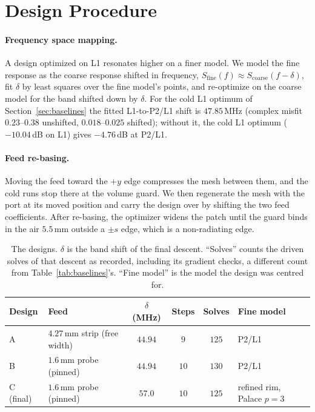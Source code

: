 \documentclass{anvil-paper}
\newcommand{\PL}{P2/L1}
\begin{document}
\section{Design Procedure}
\label{sec:procedure}

\paragraph{Frequency space mapping.}
A design optimized on L1 resonates higher on a finer model. We model the
fine response as the coarse response shifted in frequency,
$S_{\mathrm{fine}}(f) \approx S_{\mathrm{coarse}}(f - \delta)$, fit $\delta$
by least squares over the fine model's points, and re-optimize on the coarse
model for the band shifted down by $\delta$. For the cold L1 optimum of
Section~\ref{sec:baselines} the fitted L1-to-\PL{} shift is $47.85$\,MHz
(complex misfit $0.23$--$0.38$ unshifted, $0.018$--$0.025$ shifted); without
it, the cold L1 optimum ($-10.04$\,dB on L1) gives $-4.76$\,dB at \PL.

\paragraph{Feed re-basing.}
Moving the feed toward the $+y$ edge compresses the mesh between them, and
the cold runs stop there at the volume guard. We then regenerate the mesh
with the port at its moved position and carry the design over by shifting
the two feed coefficients. After re-basing, the optimizer widens the patch
until the guard binds in the air $5.5$\,mm outside a $\pm s$ edge, which is
a non-radiating edge.

\begin{table}[t]
  \centering
  \caption{The designs. $\delta$ is the band shift of the final descent.
  ``Solves'' counts the driven solves of that descent as recorded,
  including its gradient checks, a different count from
  Table~\ref{tab:baselines}'s. ``Fine model'' is the model the design was
  centred for.}
  \label{tab:chain}
  \small
  \begin{tabular}{@{}l l c c c l@{}}
    \toprule
    Design & Feed & $\delta$ (MHz) & Steps & Solves & Fine model \\
    \midrule
    A & $4.27$\,mm strip (free width) & $44.94$ & $9$ & $125$ & \PL \\
    B & $1.6$\,mm probe (pinned) & $44.94$ & $10$ & $130$ & \PL \\
    C (final) & $1.6$\,mm probe (pinned) & $57.0$ & $10$ & $125$ & refined rim, Palace $p = 3$ \\
    \bottomrule
  \end{tabular}
\end{table}
\end{document}

